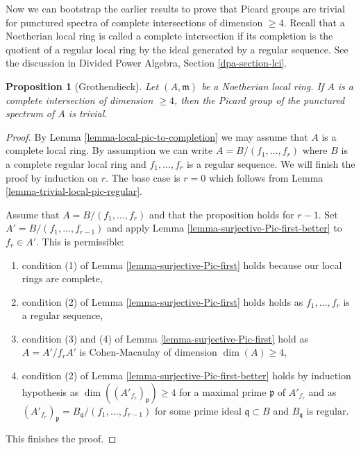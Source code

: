 \documentclass{stacks-project}
\theoremstyle{plain}
\newtheorem{proposition}[subsection]{Proposition}
\theoremstyle{definition}
\theoremstyle{remark}
\numberwithin{equation}{subsection}
\begin{document}
\noindent
Now we can bootstrap the earlier results to prove that
Picard groups are trivial for punctured spectra
of complete intersections of dimension $\geq 4$.
Recall that a Noetherian local ring is called a complete
intersection if its completion is the quotient of a
regular local ring by the ideal generated by a regular sequence.
See the discussion in Divided Power Algebra, Section \ref{dpa-section-lci}.

\begin{proposition}[Grothendieck]
\label{proposition-trivial-local-pic-complete-intersection}
Let $(A, \mathfrak m)$ be a Noetherian local ring. If $A$ is a
complete intersection of dimension $\geq 4$, then the Picard
group of the punctured spectrum of $A$ is trivial.
\end{proposition}

\begin{proof}
By Lemma \ref{lemma-local-pic-to-completion} we may assume that $A$ is
a complete local ring. By assumption we can write
$A = B/(f_1, \ldots, f_r)$ where $B$ is a complete regular local
ring and $f_1, \ldots, f_r$ is a regular sequence.
We will finish the proof by induction on $r$.
The base case is $r = 0$ which follows from
Lemma \ref{lemma-trivial-local-pic-regular}.

\medskip\noindent
Assume that $A = B/(f_1, \ldots, f_r)$ and that the proposition
holds for $r - 1$. Set $A' = B/(f_1, \ldots, f_{r - 1})$ and apply
Lemma \ref{lemma-surjective-Pic-first-better} to $f_r \in A'$.
This is permissible:
\begin{enumerate}
\item condition (1) of Lemma \ref{lemma-surjective-Pic-first} holds
because our local rings are complete,
\item condition (2) of Lemma \ref{lemma-surjective-Pic-first} holds
holds as $f_1, \ldots, f_r$ is a regular sequence,
\item condition (3) and (4) of Lemma \ref{lemma-surjective-Pic-first} hold
as $A = A'/f_r A'$ is Cohen-Macaulay of dimension $\dim(A) \geq 4$,
\item condition (2) of Lemma \ref{lemma-surjective-Pic-first-better}
holds by induction hypothesis as
$\dim((A'_{f_r})_\mathfrak p) \geq 4$ for a maximal
prime $\mathfrak p$ of $A'_{f_r}$ and as
$(A'_{f_r})_\mathfrak p = B_\mathfrak q/(f_1, \ldots, f_{r - 1})$
for some prime ideal $\mathfrak q \subset B$ and $B_\mathfrak q$ is regular.
\end{enumerate}
This finishes the proof.
\end{proof}
\end{document}

